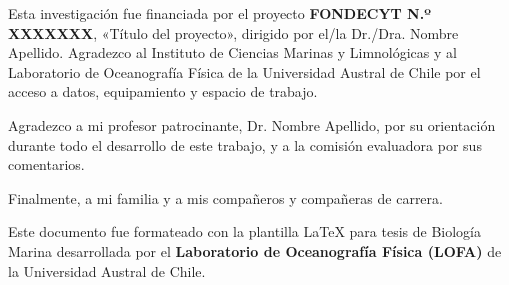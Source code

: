 %
%

\agradecimientos

Esta investigación fue financiada por el proyecto \textbf{FONDECYT N.º XXXXXXX},
«Título del proyecto», dirigido por el/la Dr./Dra. Nombre Apellido. Agradezco al
Instituto de Ciencias Marinas y Limnológicas y al Laboratorio de Oceanografía
Física de la Universidad Austral de Chile por el acceso a datos, equipamiento y
espacio de trabajo.

Agradezco a mi profesor patrocinante, Dr. Nombre Apellido, por su orientación
durante todo el desarrollo de este trabajo, y a la comisión evaluadora por sus
comentarios.

Finalmente, a mi familia y a mis compañeros y compañeras de carrera.

%
Este documento fue formateado con la plantilla \LaTeX{} para tesis de Biología
Marina desarrollada por el \textbf{Laboratorio de Oceanografía Física (LOFA)}
de la Universidad Austral de Chile.
